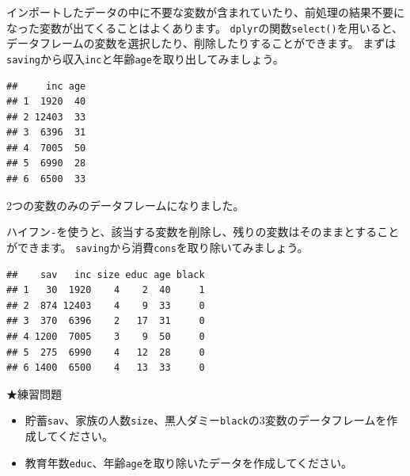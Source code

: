 \documentclass[]{book}
\newenvironment{Shaded}{\begin{snugshade}}{\end{snugshade}}
\newcommand{\KeywordTok}[1]{\textcolor[rgb]{0.13,0.29,0.53}{\textbf{#1}}}
\newcommand{\StringTok}[1]{\textcolor[rgb]{0.31,0.60,0.02}{#1}}
\newcommand{\OperatorTok}[1]{\textcolor[rgb]{0.81,0.36,0.00}{\textbf{#1}}}
\newcommand{\NormalTok}[1]{#1}
\providecommand{\tightlist}{%
  \setlength{\itemsep}{0pt}\setlength{\parskip}{0pt}}
\begin{document}
インポートしたデータの中に不要な変数が含まれていたり、前処理の結果不要になった変数が出てくることはよくあります。
\texttt{dplyr}の関数\texttt{select()}を用いると、データフレームの変数を選択したり、削除したりすることができます。
まずは\texttt{saving}から収入\texttt{inc}と年齢\texttt{age}を取り出してみましょう。

\begin{Shaded}
\end{Shaded}

\begin{verbatim}
##     inc age
## 1  1920  40
## 2 12403  33
## 3  6396  31
## 4  7005  50
## 5  6990  28
## 6  6500  33
\end{verbatim}

2つの変数のみのデータフレームになりました。

ハイフン\texttt{-}を使うと、該当する変数を削除し、残りの変数はそのままとすることができます。
\texttt{saving}から消費\texttt{cons}を取り除いてみましょう。

\begin{Shaded}
\end{Shaded}

\begin{verbatim}
##    sav   inc size educ age black
## 1   30  1920    4    2  40     1
## 2  874 12403    4    9  33     0
## 3  370  6396    2   17  31     0
## 4 1200  7005    3    9  50     0
## 5  275  6990    4   12  28     0
## 6 1400  6500    4   13  33     0
\end{verbatim}

★練習問題

\begin{itemize}
\tightlist
\item
  貯蓄\texttt{sav}、家族の人数\texttt{size}、黒人ダミー\texttt{black}の3変数のデータフレームを作成してください。
\item
  教育年数\texttt{educ}、年齢\texttt{age}を取り除いたデータを作成してください。
\end{itemize}
\end{document}
